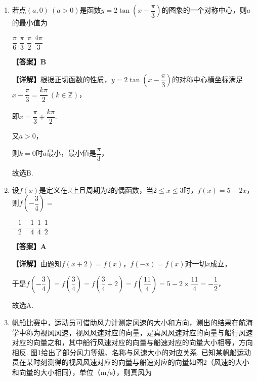 \documentclass[12pt,a4paper]{article}
\begin{document}
\begin{enumerate}[leftmargin=*,label=\arabic*.,itemsep=0.8ex]
		于是$c=\sqrt{a^2+b^2}=2\sqrt2 a$，
		
		则$e=\dfrac{c}{a}=2\sqrt2$，
		
		故选D.
		
		\item 若点$(a,0)\ (a>0)$是函数$y=2\tan\left(x-\dfrac{\pi}{3}\right)$的图象的一个对称中心，则$a$的最小值为
		\begin{choicesFour}
			\choice $\dfrac{\pi}{6}$ \choice $\dfrac{\pi}{3}$ \choice $\dfrac{\pi}{2}$ \choice $\dfrac{4\pi}{3}$
		\end{choicesFour}
		\textbf{【答案】B}
		
		\textbf{【详解】}根据正切函数的性质，$y=2\tan\left(x-\dfrac{\pi}{3}\right)$的对称中心横坐标满足$x-\dfrac{\pi}{3}=\dfrac{k\pi}{2}\ (k\in\mathbb{Z})$，
		
		即$x=\dfrac{\pi}{3}+\dfrac{k\pi}{2}$.
		
		又$a>0$，
		
		则$k=0$时$a$最小，最小值是$\dfrac{\pi}{3}$，
		
		故选B.
		
		\item 设$f(x)$是定义在$\mathbb{R}$上且周期为$2$的偶函数，当$2\le x\le3$时，$f(x)=5-2x$，则$f\left(-\dfrac34\right)=$
		\begin{choicesFour}
			\choice $-\dfrac12$ \choice $-\dfrac14$ \choice $\dfrac14$ \choice $\dfrac12$
		\end{choicesFour}
		\textbf{【答案】A}
		
		\textbf{【详解】}由题知$f(x+2)=f(x)$，$f(-x)=f(x)$对一切$x$成立，
		
		于是$f\left(-\dfrac34\right)=f\left(\dfrac34\right)=f\left(\dfrac34+2\right)=f\left(\dfrac{11}{4}\right)=5-2\times\dfrac{11}{4}=-\dfrac12$，
		
		故选A.
		
		\item 帆船比赛中，运动员可借助风力计测定风速的大小和方向，测出的结果在航海学中称为视风风速，视风风速对应的向量，是真风风速对应的向量与船行风速对应的向量之和，其中船行风速对应的向量与船速对应的向量大小相等，方向相反. 图1给出了部分风力等级、名称与风速大小的对应关系. 已知某帆船运动员在某时刻测得的视风风速对应的向量与船速对应的向量如图2（风速的大小和向量的大小相同），单位（m/s），则真风为
		

\end{enumerate}
\end{document}
